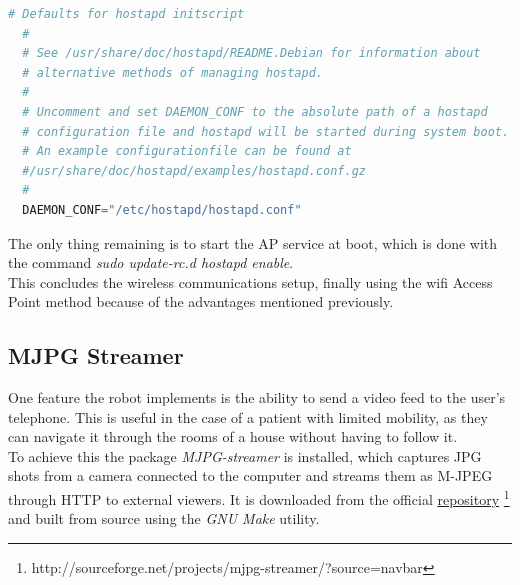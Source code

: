 	\begin{minipage}{\linewidth}%
	\begin{lstlisting}[label=ap-default,caption=AP Defaults {[} /etc/default/hostapd {]} ,language=python  ]
  # Defaults for hostapd initscript
  #
  # See /usr/share/doc/hostapd/README.Debian for information about
  # alternative methods of managing hostapd.
  #
  # Uncomment and set DAEMON_CONF to the absolute path of a hostapd 
  # configuration file and hostapd will be started during system boot. 
  # An example configurationfile can be found at 
  #/usr/share/doc/hostapd/examples/hostapd.conf.gz
  #
  DAEMON_CONF="/etc/hostapd/hostapd.conf"

	\end{lstlisting}
	\end{minipage}

\bigskip
The only thing remaining is to start the AP service at boot, which is done with the command \textit{sudo update-rc.d hostapd enable}.\\


This concludes the wireless communications setup, finally using the wifi Access Point method because of the advantages mentioned previously.











\subsection{MJPG Streamer}

One feature the robot implements is the ability to send a video feed to the user's telephone. This is useful in the case of a patient with limited mobility, as they can navigate it through the rooms of a house without having to follow it.\\

To achieve this the package \textit{MJPG-streamer} is installed, which captures JPG shots from a camera connected to the computer and streams them as M-JPEG through HTTP to external viewers. It is downloaded from the official \href{http://sourceforge.net/projects/mjpg-streamer/?source=navbar}{repository} \footnote{http://sourceforge.net/projects/mjpg-streamer/?source=navbar} and built from source using the \textit{GNU Make} utility.\\


